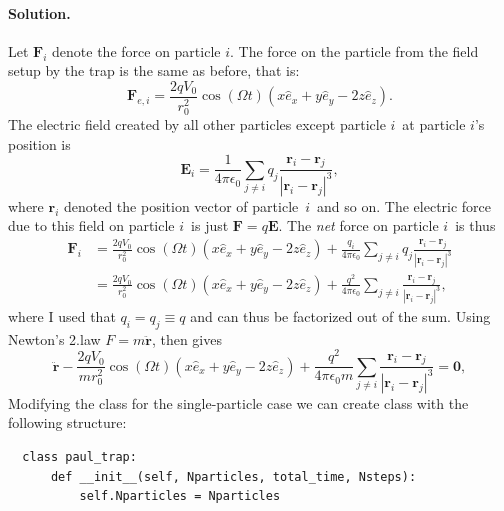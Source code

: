 \documentclass[%
oneside,                 %
final,                   %
10pt]{article}
\newenvironment{doconceexercise}{}{}
\begin{document}
\begin{doconceexercise}
\paragraph{Solution.}
Let $\boldsymbol{F}_i$ denote the force on particle $i$. The force on the particle from the field setup by the trap is the same as before, that is:
\begin{equation}
  \boldsymbol{F}_{e,i} = \frac{2qV_0}{r_0^2}\cos(\Omega t)(x\hat{e}_x + y\hat{e}_y - 2z\hat{e}_z).
\end{equation}
The electric field created by all other particles except particle $i$ at particle $i$'s position is
\begin{equation}
  \boldsymbol{E}_i = \frac{1}{4\pi \epsilon_0}\sum_{j\neq i} q_j \frac{\boldsymbol{r}_i - \boldsymbol{r}_j}{|\boldsymbol{r}_i - \boldsymbol{r}_j|^3},
\end{equation}
where $\boldsymbol{r}_i$ denoted the position vector of particle $i$ and so on. The electric force due to this field on particle $i$ is just $\boldsymbol{F} = q\boldsymbol{E}$. The \emph{net} force on particle $i$ is thus
\begin{equation}
  \begin{split}
    \boldsymbol{F}_i & = \frac{2qV_0}{r_0^2}\cos(\Omega t)(x\hat{e}_x + y\hat{e}_y - 2z\hat{e}_z) + \frac{q_i}{4\pi \epsilon_0}\sum_{j\neq i} q_j \frac{\boldsymbol{r}_i - \boldsymbol{r}_j}{|\boldsymbol{r}_i - \boldsymbol{r}_j|^3} \\
    & = \frac{2qV_0}{r_0^2}\cos(\Omega t)(x\hat{e}_x + y\hat{e}_y - 2z\hat{e}_z) + \frac{q^2}{4\pi \epsilon_0}\sum_{j\neq i}  \frac{\boldsymbol{r}_i - \boldsymbol{r}_j}{|\boldsymbol{r}_i - \boldsymbol{r}_j|^3},
  \end{split}
\end{equation}
where I used that $q_i = q_j \equiv q$ and can thus be factorized out of the sum. Using Newton's 2.law $F = m\ddot{\boldsymbol{r}}$, then gives
\begin{equation}
  \ddot{\boldsymbol{r}} - \frac{2qV_0}{mr_0^2}\cos(\Omega t)(x\hat{e}_x + y\hat{e}_y - 2z\hat{e}_z) + \frac{q^2}{4\pi \epsilon_0 m}\sum_{j\neq i}  \frac{\boldsymbol{r}_i - \boldsymbol{r}_j}{|\boldsymbol{r}_i - \boldsymbol{r}_j|^3} = \boldsymbol{0},
\end{equation}
Modifying the class for the single-particle case we can create class with the following structure:
\begin{verbatim}
  class paul_trap:
      def __init__(self, Nparticles, total_time, Nsteps):
          self.Nparticles = Nparticles

\end{verbatim}
\end{doconceexercise}
\end{document}
